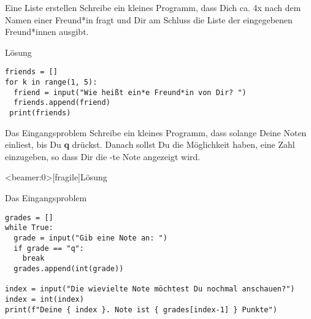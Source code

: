 \begin{fragile}[Übung]
\begin{block}{Eine Liste erstellen}
\vspace{2pt}
Schreibe ein kleines Programm, dass Dich ca. 4x nach dem Namen einer Freund*in fragt und Dir am Schluss die Liste der eingegebenen Freund*innen ausgibt. 	
\end{block}
\vspace{12pt}
\begin{solutionblock}{Lösung}
\begin{verbatim}
friends = []
for k in range(1, 5):
  friend = input("Wie heißt ein*e Freund*in von Dir? ")
  friends.append(friend)
 print(friends)
\end{verbatim}
\end{solutionblock}
\end{fragile}





\begin{fragile}[Übung]
\begin{block}{Das Eingangsproblem}
\vspace{2pt}
Schreibe ein kleines Programm, dass solange Deine Noten einliest, bis Du \textbf{q} drückst. Danach sollst Du die Möglichkeit haben, eine Zahl  einzugeben, so dass Dir die -te Note angezeigt wird. 
\end{block}	
\end{fragile}

\begin{frame}<beamer:0>[fragile]{Lösung}
\begin{solutionblock}{Das Eingangsproblem}
\begin{verbatim}
grades = []
while True:
  grade = input("Gib eine Note an: ")
  if grade == "q":
    break
  grades.append(int(grade))

index = input("Die wievielte Note möchtest Du nochmal anschauen?")
index = int(index)
print(f"Deine { index }. Note ist { grades[index-1] } Punkte")
\end{verbatim}
\end{solutionblock}
\end{frame}

